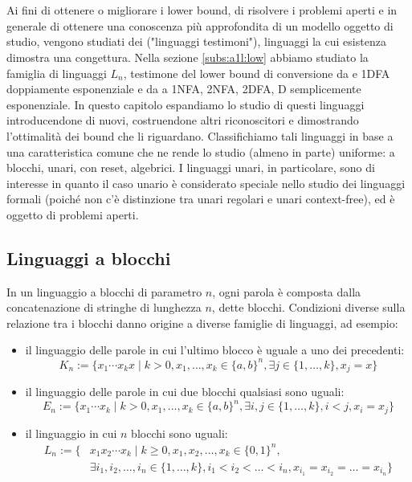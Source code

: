 \chapter{}
Ai fini di ottenere o migliorare i lower bound, di risolvere i problemi aperti e in generale di ottenere una conoscenza più approfondita di un modello oggetto di studio, vengono studiati dei  ("linguaggi testimoni"), linguaggi la cui esistenza dimostra una congettura. Nella sezione \ref{subs:a1l:low} abbiamo studiato la famiglia di linguaggi $L_n$, testimone del lower bound di conversione da  e 1DFA doppiamente esponenziale e da  a 1NFA, 2NFA, 2DFA, D semplicemente esponenziale. In questo capitolo espandiamo lo studio di questi linguaggi introducendone di nuovi, costruendone altri riconoscitori e dimostrando l'ottimalità dei bound che li riguardano. Classifichiamo tali linguaggi in base a una caratteristica comune che ne rende lo studio (almeno in parte) uniforme: a blocchi, unari, con reset, algebrici. I linguaggi unari, in particolare, sono di interesse in quanto il caso unario è considerato speciale nello studio dei linguaggi formali (poiché non c'è distinzione tra unari regolari e unari context-free), ed è oggetto di problemi aperti.



\section{Linguaggi a blocchi}
In un linguaggio a blocchi di parametro $n$, ogni parola è composta dalla concatenazione di stringhe di lunghezza $n$, dette blocchi. Condizioni diverse sulla relazione tra i blocchi danno origine a diverse famiglie di linguaggi, ad esempio:
\begin{itemize}
	\item il linguaggio delle parole in cui l'ultimo blocco è uguale a uno dei precedenti:
	      \begin{equation*}
		      K_n := \{ x_1\cdots x_kx \mid k>0, x_1,\dots,x_k\in\{a,b\}^n, \exists j\in\{1,\dots,k\},x_j=x\}
	      \end{equation*}
	\item il linguaggio delle parole in cui due blocchi qualsiasi sono uguali:
	      \begin{equation*}
		      E_n := \{x_1\cdots x_k \mid k>0, x_1,\dots,x_k\in\{a,b\}^n,\exists i,j\in\{1,\dots,k\},i<j,x_i=x_j\}
	      \end{equation*}
	\item il linguaggio in cui $n$ blocchi sono uguali:
	      \begin{align*}
		      L_n := \{ & x_1x_2\cdots x_k\mid k\geq0, x_1,x_2,\dots,x_k\in\{0,1\}^n,                                  \\
		                & \exists i_1,i_2,\dots,i_n\in\{1,\dots,k\},i_1<i_2<\dots<i_n, x_{i_1}=x_{i_2}=\dots=x_{i_n}\}
	      \end{align*}
\end{itemize}

